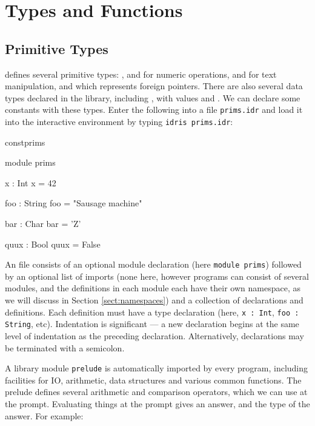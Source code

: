 \section{Types and Functions}

\subsection{Primitive Types}

\Idris{} defines several primitive types: ,  and
 for numeric operations,  and  for
text manipulation, and  which represents foreign pointers.
There are also several data types declared in the library, including
, with values  and .
We can declare some constants with these types. Enter the following
into a file \texttt{prims.idr} and load it into the \Idris{} interactive
environment by typing \texttt{idris prims.idr}:

\begin{SaveVerbatim}{constprims}

module prims

x : Int
x = 42

foo : String
foo = "Sausage machine"

bar : Char
bar = 'Z'

quux : Bool
quux = False

\end{SaveVerbatim}

\noindent
An \Idris{} file consists of an optional module declaration (here
\texttt{module prims}) followed by an optional list of imports (none here,
however \Idris{} programs can consist of several modules, and the definitions
in each module each have their own namespace, as we will discuss in Section
\ref{sect:namespaces}) and a
collection of declarations and definitions. Each definition must have a type
declaration (here, \texttt{x : Int}, \texttt{foo : String}, etc).
Indentation is significant --- a new declaration begins at the same level
of indentation as the preceding declaration. Alternatively, declarations
may be terminated with a semicolon.

A library module \texttt{prelude} is automatically imported by every \Idris{} program,
including facilities for IO, arithmetic, data structures and various common
functions. The prelude defines several arithmetic and comparison operators,
which we can use at the prompt. Evaluating things at the prompt gives an
answer, and the type of the answer. For example:

